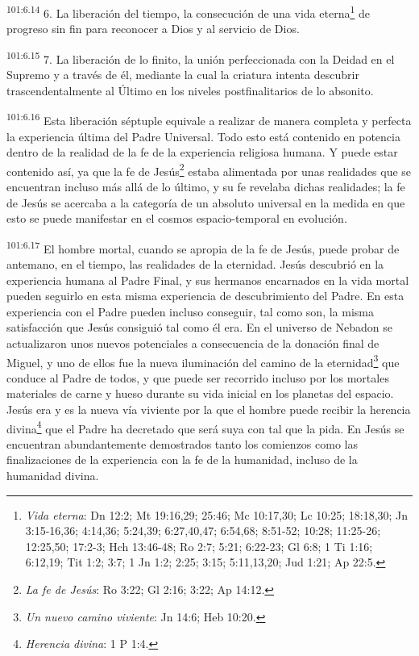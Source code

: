 \documentclass[twoside, 11pt]{book}
\begin{document}
\par
\textsuperscript{101:6.14} 6. La liberación del tiempo, la consecución de una vida eterna\footnote{\textit{Vida eterna}: Dn 12:2; Mt 19:16,29; 25:46; Mc 10:17,30; Lc 10:25; 18:18,30; Jn 3:15-16,36; 4:14,36; 5:24,39; 6:27,40,47; 6:54,68; 8:51-52; 10:28; 11:25-26; 12:25,50; 17:2-3; Hch 13:46-48; Ro 2:7; 5:21; 6:22-23; Gl 6:8; 1 Ti 1:16; 6:12,19; Tit 1:2; 3:7; 1 Jn 1:2; 2:25; 3:15; 5:11,13,20; Jud 1:21; Ap 22:5.} de progreso sin fin para reconocer a Dios y al servicio de Dios.

\par
\textsuperscript{101:6.15} 7. La liberación de lo finito, la unión perfeccionada con la Deidad en el Supremo y a través de él, mediante la cual la criatura intenta descubrir trascendentalmente al Último en los niveles postfinalitarios de lo absonito.

\par
\textsuperscript{101:6.16} Esta liberación séptuple equivale a realizar de manera completa y perfecta la experiencia última del Padre Universal. Todo esto está contenido en potencia dentro de la realidad de la fe de la experiencia religiosa humana. Y puede estar contenido así, ya que la fe de Jesús\footnote{\textit{La fe de Jesús}: Ro 3:22; Gl 2:16; 3:22; Ap 14:12.} estaba alimentada por unas realidades que se encuentran incluso más allá de lo último, y su fe revelaba dichas realidades; la fe de Jesús se acercaba a la categoría de un absoluto universal en la medida en que esto se puede manifestar en el cosmos espacio-temporal en evolución.

\par
\textsuperscript{101:6.17} El hombre mortal, cuando se apropia de la fe de Jesús, puede probar de antemano, en el tiempo, las realidades de la eternidad. Jesús descubrió en la experiencia humana al Padre Final, y sus hermanos encarnados en la vida mortal pueden seguirlo en esta misma experiencia de descubrimiento del Padre. En esta experiencia con el Padre pueden incluso conseguir, tal como son, la misma satisfacción que Jesús consiguió tal como él era. En el universo de Nebadon se actualizaron unos nuevos potenciales a consecuencia de la donación final de Miguel, y uno de ellos fue la nueva iluminación del camino de la eternidad\footnote{\textit{Un nuevo camino viviente}: Jn 14:6; Heb 10:20.} que conduce al Padre de todos, y que puede ser recorrido incluso por los mortales materiales de carne y hueso durante su vida inicial en los planetas del espacio. Jesús era y es la nueva vía viviente por la que el hombre puede recibir la herencia divina\footnote{\textit{Herencia divina}: 1 P 1:4.} que el Padre ha decretado que será suya con tal que la pida. En Jesús se encuentran abundantemente demostrados tanto los comienzos como las finalizaciones de la experiencia con la fe de la humanidad, incluso de la humanidad divina.
\end{document}

